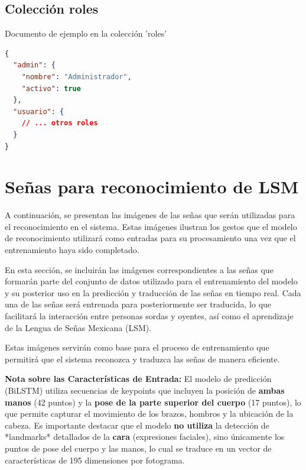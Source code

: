 \subsection{Colección roles}

\begin{codebox}{Documento de ejemplo en la colección 'roles'}
\begin{lstlisting}[language=json, caption={Documento de ejemplo en la colección 'roles'}, label=lst:roles]
{
  "admin": {
    "nombre": "Administrador",
    "activo": true
  },
  "usuario": {
    // ... otros roles
  }
}
\end{lstlisting}
\end{codebox}

\section{Señas para reconocimiento de LSM}
\label{sec:señas_reconocimiento_LSM}

A continuación, se presentan las imágenes de las señas que serán utilizadas para el reconocimiento en el sistema. Estas imágenes ilustran los gestos que el modelo de reconocimiento utilizará como entradas para su procesamiento una vez que el entrenamiento haya sido completado.

En esta sección, se incluirán las imágenes correspondientes a las señas que formarán parte del conjunto de datos utilizado para el entrenamiento del modelo y su posterior uso en la predicción y traducción de las señas en tiempo real. Cada una de las señas será entrenada para posteriormente ser traducida, lo que facilitará la interacción entre personas sordas y oyentes, así como el aprendizaje de la Lengua de Señas Mexicana (LSM).

Estas imágenes servirán como base para el proceso de entrenamiento que permitirá que el sistema reconozca y traduzca las señas de manera eficiente.

\textbf{Nota sobre las Características de Entrada:} El modelo de predicción (BiLSTM) utiliza secuencias de keypoints que incluyen la posición de \textbf{ambas manos} (42 puntos) y la \textbf{pose de la parte superior del cuerpo} (17 puntos), lo que permite capturar el movimiento de los brazos, hombros y la ubicación de la cabeza. Es importante destacar que el modelo \textbf{no utiliza} la detección de *landmarks* detallados de la \textbf{cara} (expresiones faciales), sino únicamente los puntos de pose del cuerpo y las manos, lo cual se traduce en un vector de características de 195 dimensiones por fotograma.

